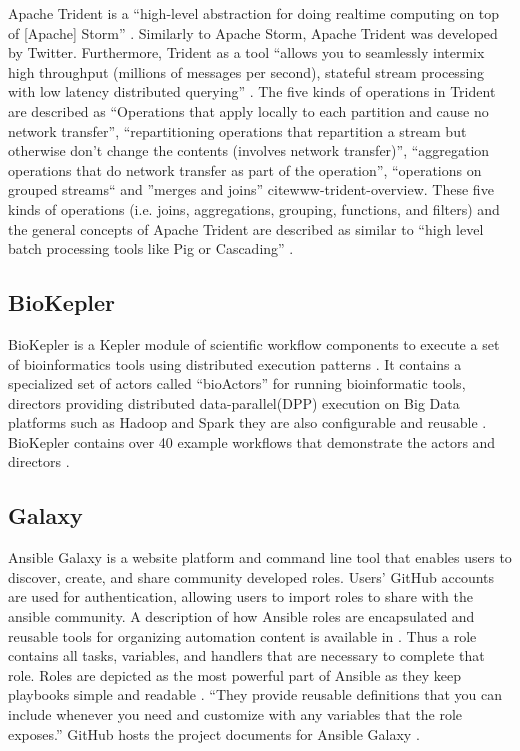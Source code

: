    Apache Trident is a ``high-level abstraction for doing realtime computing
   on top of [Apache] Storm'' \cite{www-trident-tutorial}. Similarly to
   Apache Storm, Apache Trident was developed by Twitter.
   Furthermore, Trident as a tool ``allows you to seamlessly intermix
   high throughput (millions of messages per second), stateful stream 
   processing with low latency distributed querying'' \cite{www-trident-tutorial}.
   The five kinds of operations in Trident are described as
   ``Operations that apply locally to each partition and cause no network
   transfer'', ``repartitioning operations
   that repartition a stream but otherwise don't change the contents 
   (involves network transfer)'', ``aggregation operations that do 
   network transfer as part of the operation'', ``operations on grouped 
   streams`` and ''merges and joins'' cite{www-trident-overview}.
   These five kinds of operations (i.e. joins, aggregations, grouping,
   functions, and filters) and the general concepts of Apache Trident 
   are described as similar to ``high level batch processing tools like 
   Pig or Cascading'' \cite{www-trident-tutorial}.

\pv

\subsection{BioKepler}
    
    BioKepler is a Kepler module of scientific workflow components to
    execute a set of bioinformatics tools using distributed execution
    patterns \cite{www-biokepler}. It contains a specialized set of
    actors called ``bioActors'' for running bioinformatic tools,
    directors providing distributed data-parallel(DPP) execution on
    Big Data platforms such as Hadoop and Spark they are also
    configurable and reusable \cite{www-biokepler-demos}. BioKepler
    contains over 40 example workflows that demonstrate the actors and
    directors \cite{bioActors}.

    \pv
    
\subsection{Galaxy}

    Ansible Galaxy is a website platform and command line tool that
    enables users to discover, create, and share community developed
    roles. Users' GitHub accounts are used for authentication,
    allowing users to import roles to share with the ansible
    community. A description of how Ansible roles
    are encapsulated and reusable tools for organizing automation
    content is available in \cite{www-galaxy-ansible}. Thus a role contains
    all tasks, variables, and handlers that are necessary to complete that
    role. Roles are depicted as the most powerful
    part of Ansible as they keep playbooks simple and readable
    \cite{Ansible-book-2016}. ``They provide reusable definitions that you
    can include whenever you need and customize with any variables that the
    role exposes.'' GitHub hosts the project documents for
    Ansible Galaxy \cite{www-github-galaxy}.


